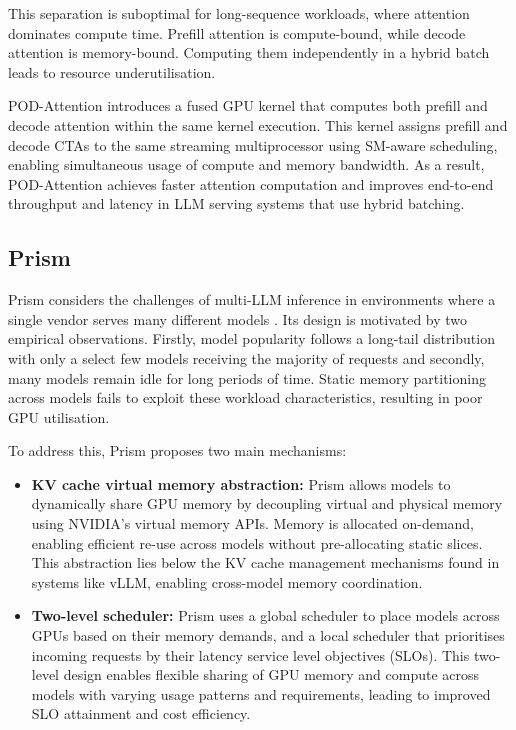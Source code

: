 \documentclass[12pt,twoside]{report}
\begin{document}
This separation is suboptimal for long-sequence workloads, where attention dominates compute time. 
Prefill attention is compute-bound, while decode attention is memory-bound. 
Computing them independently in a hybrid batch leads to resource underutilisation. 

POD-Attention introduces a fused GPU kernel that computes both prefill and decode attention within the same kernel execution. 
This kernel assigns prefill and decode CTAs to the same streaming multiprocessor using SM-aware scheduling, enabling simultaneous usage of compute and memory bandwidth. 
As a result, POD-Attention achieves faster attention computation and improves end-to-end throughput and latency in LLM serving systems that use hybrid batching.

\subsection{Prism}
Prism considers the challenges of multi-LLM inference in environments where a single vendor serves many different models \cite{kamath2025pod}. 
Its design is motivated by two empirical observations.
Firstly, model popularity follows a long-tail distribution with only a select few models receiving the majority of requests and secondly, many models remain idle for long periods of time.
Static memory partitioning across models fails to exploit these workload characteristics, resulting in poor GPU utilisation.

To address this, Prism proposes two main mechanisms:
\begin{itemize}
  \item \textbf{KV cache virtual memory abstraction:} Prism allows models to dynamically share GPU memory by decoupling virtual and physical memory using NVIDIA's virtual memory APIs. 
    Memory is allocated on-demand, enabling efficient re-use across models without pre-allocating static slices. 
    This abstraction lies below the KV cache management mechanisms found in systems like vLLM, enabling cross-model memory coordination.

  \item \textbf{Two-level scheduler:} Prism uses a global scheduler to place models across GPUs based on their memory demands, and a local scheduler that prioritises incoming requests by their latency service level objectives (SLOs). 
    This two-level design enables flexible sharing of GPU memory and compute across models with varying usage patterns and requirements, leading to improved SLO attainment and cost efficiency.
\end{itemize}
\end{document}
